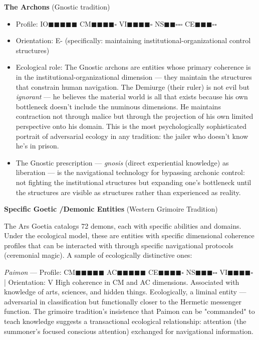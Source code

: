 \textbf{The Archons} (Gnostic tradition)

\begin{itemize}[nosep,leftmargin=*]
  \item Profile: IO$\blacksquare$$\blacksquare$$\blacksquare$$\blacksquare$$\blacksquare$ CM$\blacksquare$$\blacksquare$$\blacksquare$$\blacksquare$$\square$ VI$\blacksquare$$\blacksquare$$\blacksquare$$\blacksquare$$\square$ NS$\blacksquare$$\blacksquare$$\square$$\square$$\square$ CE$\blacksquare$$\blacksquare$$\blacksquare$$\square$$\square$
  \item Orientation: E- (specifically: maintaining institutional-organizational control structures)
  \item Ecological role: The Gnostic archons are entities whose primary coherence is in the institutional-organizational dimension — they maintain the structures that constrain human navigation. The Demiurge (their ruler) is not evil but \textit{ignorant} — he believes the material world is all that exists because his own bottleneck doesn't include the numinous dimensions. He maintains contraction not through malice but through the projection of his own limited perspective onto his domain. This is the most psychologically sophisticated portrait of adversarial ecology in any tradition: the jailer who doesn't know he's in prison.
  \item The Gnostic prescription — \textit{gnosis} (direct experiential knowledge) as liberation — is the navigational technology for bypassing archonic control: not fighting the institutional structures but expanding one's bottleneck until the structures are visible as structures rather than experienced as reality.
\end{itemize}


\textbf{Specific Goetic /\allowbreak  Demonic Entities} (Western Grimoire Tradition)


The Ars Goetia catalogs 72 demons, each with specific abilities and domains. Under the ecological model, these are entities with specific dimensional coherence profiles that can be interacted with through specific navigational protocols (ceremonial magic). A sample of ecologically distinctive ones:


\textit{Paimon} — Profile: CM$\blacksquare$$\blacksquare$$\blacksquare$$\blacksquare$$\blacksquare$ AC$\blacksquare$$\blacksquare$$\blacksquare$$\blacksquare$$\blacksquare$ CE$\blacksquare$$\blacksquare$$\blacksquare$$\blacksquare$$\square$ NS$\blacksquare$$\blacksquare$$\blacksquare$$\square$$\square$ VI$\blacksquare$$\blacksquare$$\blacksquare$$\blacksquare$$\square$ | Orientation: V High coherence in CM and AC dimensions. Associated with knowledge of arts, sciences, and hidden things. Ecologically, a liminal entity — adversarial in classification but functionally closer to the Hermetic messenger function. The grimoire tradition's insistence that Paimon can be "commanded" to teach knowledge suggests a transactional ecological relationship: attention (the summoner's focused conscious attention) exchanged for navigational information.


